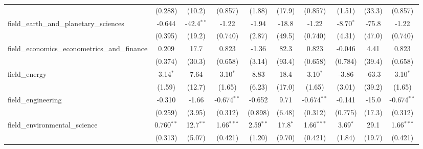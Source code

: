 \begin{tabular}{lccccccccc}
                                                               & (0.288)        & (10.2)         & (0.857)       & (1.88)        & (17.9)         & (0.857)       & (1.51)         & (33.3)        & (0.857)\\   
   field\_earth\_and\_planetary\_sciences                      & -0.644         & -42.4$^{**}$   & -1.22         & -1.94         & -18.8          & -1.22         & -8.70$^{*}$    & -75.8         & -1.22\\   
                                                               & (0.395)        & (19.2)         & (0.740)       & (2.87)        & (49.5)         & (0.740)       & (4.31)         & (47.0)        & (0.740)\\   
   field\_economics\_econometrics\_and\_finance                & 0.209          & 17.7           & 0.823         & -1.36         & 82.3           & 0.823         & -0.046         & 4.41          & 0.823\\   
                                                               & (0.374)        & (30.3)         & (0.658)       & (3.14)        & (93.4)         & (0.658)       & (0.784)        & (39.4)        & (0.658)\\   
   field\_energy                                               & 3.14$^{*}$     & 7.64           & 3.10$^{*}$    & 8.83          & 18.4           & 3.10$^{*}$    & -3.86          & -63.3         & 3.10$^{*}$\\   
                                                               & (1.59)         & (12.7)         & (1.65)        & (6.23)        & (17.0)         & (1.65)        & (3.01)         & (39.2)        & (1.65)\\   
   field\_engineering                                          & -0.310         & -1.66          & -0.674$^{**}$ & -0.652        & 9.71           & -0.674$^{**}$ & -0.141         & -15.0         & -0.674$^{**}$\\   
                                                               & (0.259)        & (3.95)         & (0.312)       & (0.898)       & (6.48)         & (0.312)       & (0.775)        & (17.3)        & (0.312)\\   
   field\_environmental\_science                               & 0.760$^{**}$   & 12.7$^{**}$    & 1.66$^{***}$  & 2.59$^{**}$   & 17.8$^{*}$     & 1.66$^{***}$  & 3.69$^{*}$     & 29.1          & 1.66$^{***}$\\   
                                                               & (0.313)        & (5.07)         & (0.421)       & (1.20)        & (9.70)         & (0.421)       & (1.84)         & (19.7)        & (0.421)\\   

\end{tabular}
